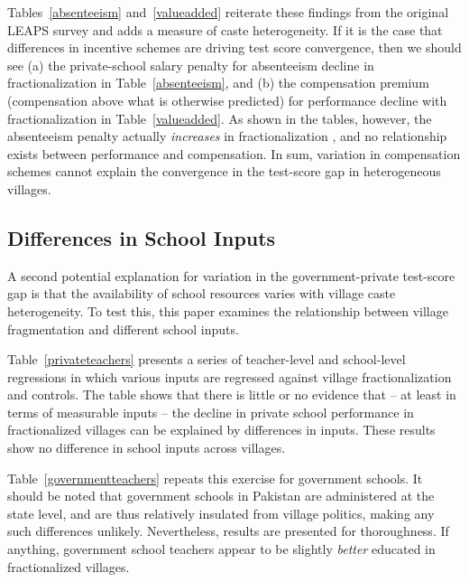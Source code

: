 \documentclass[Eubank_pk_ethnic_sorting.tex]{subfiles}
\begin{document}
Tables~\ref{absenteeism} and~\ref{valueadded} reiterate these findings from the original LEAPS survey and adds a measure of caste heterogeneity. If it is the case that differences in incentive schemes are driving test score convergence, then we should see (a) the private-school salary penalty for absenteeism decline in fractionalization in Table~\ref{absenteeism}, and (b) the compensation premium (compensation above what is otherwise predicted) for performance decline with fractionalization in Table~\ref{valueadded}. As shown in the tables, however, the absenteeism penalty actually \emph{increases} in fractionalization , and no relationship exists between performance and compensation. In sum, variation in compensation schemes cannot explain the convergence in the test-score gap in heterogeneous villages.






\subsection{Differences in School Inputs}

A second potential explanation for variation in the government-private test-score gap is that the availability of school resources varies with village caste heterogeneity. To test this, this paper examines the relationship between village fragmentation and different school inputs.

Table~\ref{privateteachers} presents a series of teacher-level and school-level regressions in which various inputs are regressed against village fractionalization and controls. The table shows that there is little or no evidence that -- at least in terms of measurable inputs -- the decline in private school performance in fractionalized villages can be explained by differences in inputs.  These results show no difference in school inputs across villages.



Table~\ref{governmentteachers} repeats this exercise for government schools. It should be noted that government schools in Pakistan are administered at the state level, and are thus relatively insulated from village politics, making any such differences unlikely. Nevertheless, results are presented for thoroughness. If anything, government school teachers appear to be slightly \emph{better} educated in fractionalized villages.


\end{document}
